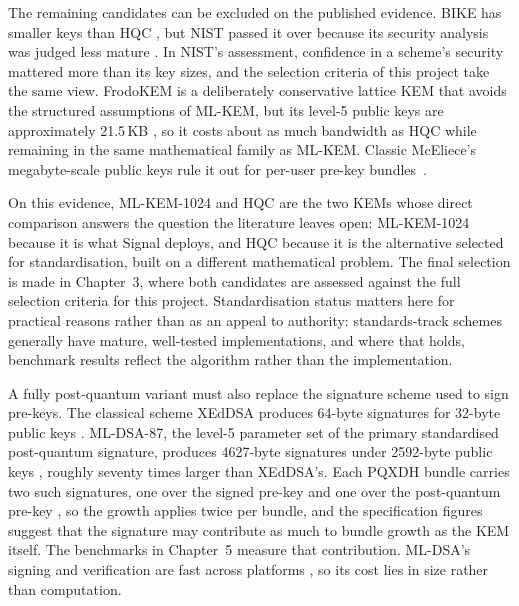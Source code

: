 The remaining candidates can be excluded on the published evidence. BIKE has smaller keys than HQC \cite{aragon_bike_nodate}, but NIST passed it over because its security analysis was judged less mature \cite{alagic_status_2025}. In NIST's assessment, confidence in a scheme's security mattered more than its key sizes, and the selection criteria of this project take the same view. FrodoKEM is a deliberately conservative lattice KEM that avoids the structured assumptions of ML-KEM, but its level-5 public keys are approximately 21.5\,KB \cite{alkim_frodokem_nodate}, so it costs about as much bandwidth as HQC while remaining in the same mathematical family as ML-KEM. Classic McEliece's megabyte-scale public keys rule it out for per-user pre-key bundles~\cite{bernstein_classic_nodate}.

On this evidence, ML-KEM-1024 and HQC are the two KEMs whose direct comparison answers the question the literature leaves open: ML-KEM-1024 because it is what Signal deploys, and HQC because it is the alternative selected for standardisation, built on a different mathematical problem. The final selection is made in Chapter~3, where both candidates are assessed against the full selection criteria for this project. Standardisation status matters here for practical reasons rather than as an appeal to authority: standards-track schemes generally have mature, well-tested implementations, and where that holds, benchmark results reflect the algorithm rather than the implementation.

A fully post-quantum variant must also replace the signature scheme used to sign pre-keys. The classical scheme XEdDSA produces 64-byte signatures for 32-byte public keys \cite{perrin_xeddsa_nodate}. ML-DSA-87, the level-5 parameter set of the primary standardised post-quantum signature, produces 4627-byte signatures under 2592-byte public keys \cite{national_institute_of_standards_and_technology_us_module-lattice-based_2024}, roughly seventy times larger than XEdDSA's. Each PQXDH bundle carries two such signatures, one over the signed pre-key and one over the post-quantum pre-key \cite{kret_pqxdh_nodate}, so the growth applies twice per bundle, and the specification figures suggest that the signature may contribute as much to bundle growth as the KEM itself. The benchmarks in Chapter~5 measure that contribution. ML-DSA's signing and verification are fast across platforms \cite{open_quantum_safe_project_benchmarking_nodate}, so its cost lies in size rather than computation.

